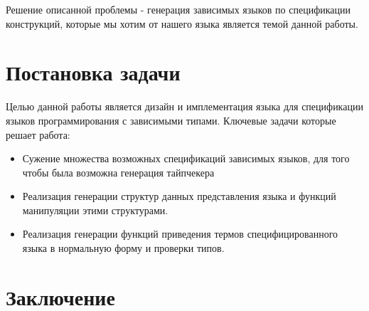 \documentclass{spbau-diploma}
\begin{document}
Решение описанной проблемы - генерация зависимых языков по спецификации конструкций, которые мы хотим от нашего языка является темой данной работы.

\section{Постановка задачи}

Целью данной работы является дизайн и имплементация языка для спецификации языков программирования с зависимыми типами. Ключевые задачи которые решает работа:
\begin{itemize}
  \item Сужение множества возможных спецификаций зависимых языков, для того чтобы была возможна генерация тайпчекера
  \item Реализация генерации структур данных представления языка и функций манипуляции этими структурами.
  \item Реализация генерации функций приведения термов специфицированного языка в нормальную форму и проверки типов.
\end{itemize}






\section*{Заключение}





\end{document}
